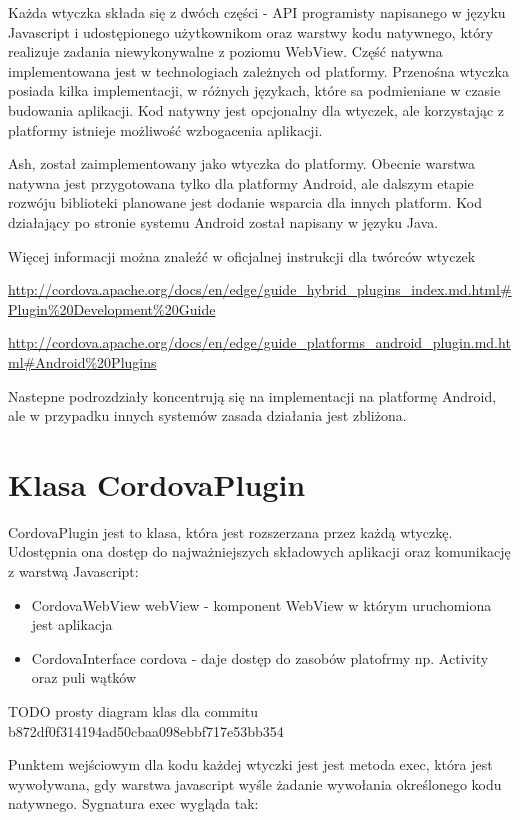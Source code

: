 \documentclass[brudnopis]{xmgr}
\begin{document}
Każda wtyczka składa się z dwóch części - API programisty napisanego w języku Javascript i udostępionego użytkownikom oraz warstwy kodu natywnego, który realizuje zadania niewykonywalne z poziomu WebView. Część natywna implementowana jest w technologiach zależnych od platformy. Przenośna wtyczka posiada kilka implementacji, w różnych językach, które sa podmieniane w czasie budowania aplikacji. Kod natywny jest opcjonalny dla wtyczek, ale korzystając z platformy istnieje możliwość wzbogacenia aplikacji.

Ash, został zaimplementowany jako wtyczka do platformy. Obecnie warstwa natywna jest przygotowana tylko dla platformy Android, ale dalszym etapie rozwóju biblioteki planowane jest dodanie wsparcia dla innych platform. Kod działający po stronie systemu Android został napisany w języku Java.

Więcej informacji można znaleźć w oficjalnej instrukcji dla twórców wtyczek

\url{http://cordova.apache.org/docs/en/edge/guide\_hybrid\_plugins\_index.md.html\#Plugin\%20Development\%20Guide}  

\url{http://cordova.apache.org/docs/en/edge/guide\_platforms\_android\_plugin.md.html\#Android\%20Plugins}   

Nastepne podrozdziały koncentrują się na implementacji na platformę Android, ale w przypadku innych systemów zasada działania jest zbliżona.

\section{Klasa CordovaPlugin}

CordovaPlugin jest to klasa, która jest rozszerzana przez każdą wtyczkę. Udostępnia ona dostęp do najważniejszych składowych aplikacji oraz komunikację z warstwą Javascript: 

\begin{itemize}
  \item CordovaWebView webView - komponent WebView w którym uruchomiona jest aplikacja
  \item CordovaInterface cordova - daje dostęp do zasobów platofrmy np. Activity oraz puli wątków
\end{itemize}

{TODO prosty diagram klas dla commitu b872df0f314194ad50cbaa098ebbf717e53bb354}

Punktem wejściowym dla kodu każdej wtyczki jest jest metoda exec, która jest wywoływana, gdy warstwa javascript wyśle żadanie wywołania określonego kodu natywnego. Sygnatura exec wygląda tak:
\end{document}
